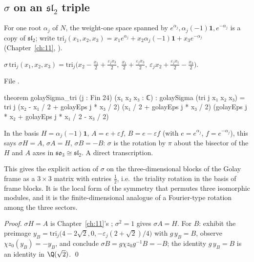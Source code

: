 \subsection{\texorpdfstring{$\sigma$ on an $\mathfrak{sl}_2$ triple}{sigma on an mathfraksl2 triple}}
For one root $\alpha_j$ of $N$, the weight-one space spanned by $e^{\alpha_j},\alpha_j(-1)\mathbf 1,e^{-\alpha_j}$ is a copy of
$\mathfrak{sl}_2$; write $\mathrm{tri}_j(x_1,x_2,x_3)=x_1e^{\alpha_j}+x_2\alpha_j(-1)\mathbf 1+x_3e^{-\alpha_j}$ (Chapter~\ref{ch:11},
).
\begin{proposition}\label{ch13:prop:tri}
$\sigma\,\mathrm{tri}_j(x_1,x_2,x_3)=\mathrm{tri}_j\bigl(x_2-\tfrac{x_1}2+\tfrac{\varepsilon_jx_3}2,\ \tfrac{x_1}2+\tfrac{\varepsilon_jx_3}2,\
\varepsilon_jx_2+\tfrac{\varepsilon_jx_1}2-\tfrac{x_3}2\bigr)$.
\end{proposition}
\noindent File .
\begin{leancode}
theorem golaySigma_tri (j : Fin 24) (x₁ x₂ x₃ : ℂ) :
    golaySigma (tri j x₁ x₂ x₃) =
      tri j (x₂ - x₁ / 2 + golayEps j * x₃ / 2) (x₁ / 2 + golayEps j * x₃ / 2)
        (golayEps j * x₂ + golayEps j * x₁ / 2 - x₃ / 2)
\end{leancode}
\begin{dictionary}
In the basis $H=\alpha_j(-1)\mathbf1$, $A=e+\varepsilon f$, $B=e-\varepsilon f$ (with $e=e^{\alpha_j}$, $f=e^{-\alpha_j}$), this says
$\sigma H=A$, $\sigma A=H$, $\sigma B=-B$: $\sigma$ is the rotation by $\pi$ about the bisector of the $H$ and $A$ axes
in $\mathfrak{so}_3\cong\mathfrak{sl}_2$. A direct transcription.
\end{dictionary}
\begin{physics}
This gives the explicit action of $\sigma$ on the three-dimensional blocks of the Golay frame as a $3\times3$ matrix with entries $\tfrac12$, i.e.\ the triality rotation in the basis of frame blocks. It is the local form of the symmetry that permutes three isomorphic modules, and it is the finite-dimensional analogue of a Fourier-type rotation among the three sectors.
\end{physics}
\noindent\emph{Proof.} $\sigma H=A$ is Chapter~\ref{ch:11}'s ; $\sigma^2=1$ gives $\sigma A=H$. For $B$:
exhibit the preimage $y_B=\mathrm{tri}_j\bigl(4-2\sqrt2,0,-\varepsilon_j(2+\sqrt2)/4\bigr)$ with $g\,y_B=B$, observe
$\chi z_0(y_B)=-y_B$, and conclude $\sigma B=g\chi z_0g^{-1}B=-B$; the identity $g\,y_B=B$ is an identity in
$\Q(\sqrt2)$. \qed

